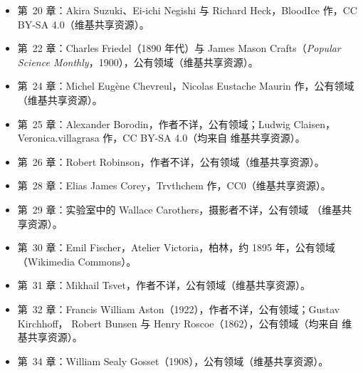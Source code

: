 \begin{itemize}
        来自 维基共享资源）。
  \item 第~20 章：Akira Suzuki、Ei-ichi Negishi 与 Richard Heck，BloodIce 作，CC BY-SA
        4.0（维基共享资源）。
  \item 第~22 章：Charles Friedel（1890 年代）与 James Mason Crafts（\textit{Popular
        Science Monthly}，1900），公有领域（维基共享资源）。
  \item 第~24 章：Michel Eug\`ene Chevreul，Nicolas Eustache Maurin 作，公有领域
        （维基共享资源）。
  \item 第~25 章：Alexander Borodin，作者不详，公有领域；Ludwig Claisen，
        Veronica.villagrasa 作，CC BY-SA 4.0（均来自 维基共享资源）。
  \item 第~26 章：Robert Robinson，作者不详，公有领域（维基共享资源）。
  \item 第~28 章：Elias James Corey，Trvthchem 作，CC0（维基共享资源）。
  \item 第~29 章：实验室中的 Wallace Carothers，摄影者不详，公有领域
        （维基共享资源）。
  \item 第~30 章：Emil Fischer，Atelier Victoria，柏林，约 1895 年，公有领域（Wikimedia
        Commons）。
  \item 第~31 章：Mikhail Tsvet，作者不详，公有领域（维基共享资源）。
  \item 第~32 章：Francis William Aston（1922），作者不详，公有领域；Gustav Kirchhoff，
        Robert Bunsen 与 Henry Roscoe（1862），公有领域（均来自 维基共享资源）。
  \item 第~34 章：William Sealy Gosset（1908），公有领域（维基共享资源）。
\end{itemize}
\clearpage
